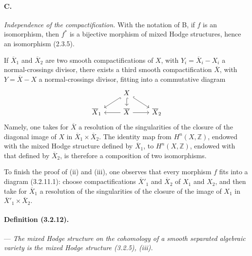 \documentclass[10pt]{article}
\newcommand{\Z}{\mathbb Z}
\begin{document}
\paragraph{C.} \textit{Independence of the compactification.} With the notation of B, if $f$ is an isomorphism, then $f^*$ is a bijective morphism of mixed Hodge structures, hence an isomorphism (2.3.5).

If $\overline X_1$ and $\overline X_2$ are two smooth compactifications of $X$, with $Y_i=\overline X_i-X_i$ a normal-crossings divisor, there exists a third smooth compactification $\overline X$, with $Y=\overline X-X$ a normal-crossings divisor, fitting into a commutative diagram
\[
\begin{tikzcd}[row sep=1.2em,column sep=2.4em]
& X \arrow[hook,dl] \arrow[hook,d] \arrow[hook,dr] & \\
\overline X_1 & \overline X \arrow[l] \arrow[r] & \overline X_2
\end{tikzcd}
\]
Namely, one takes for $\overline X$ a resolution of the singularities of the closure of the diagonal image of $X$ in $\overline X_1\times\overline X_2$. The identity map from $H^n(X,\Z)$, endowed with the mixed Hodge structure defined by $\overline X_1$, to $H^n(X,\Z)$, endowed with that defined by $\overline X_2$, is therefore a composition of two isomorphisms.

To finish the proof of (ii) and (iii), one observes that every morphism $f$ fits into a diagram (3.2.11.1): choose compactifications $\overline X'_1$ and $\overline X_2$ of $X_1$ and $X_2$, and then take for $\overline X_1$ a resolution of the singularities of the closure of the image of $X_1$ in $\overline X'_1\times\overline X_2$.

\paragraph{Definition (3.2.12).} --- {\itshape The mixed Hodge structure on the cohomology of a smooth separated algebraic variety is the mixed Hodge structure (3.2.5), (iii).}
\end{document}
